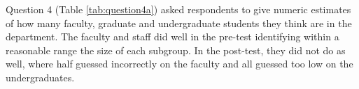 Question 4 (Table \ref{tab:question4a}) asked respondents to give numeric
estimates of how many faculty, graduate and undergraduate students they think
are in the department.  The faculty and staff did well in the pre-test
identifying within a reasonable range the size of each subgroup.  In the
post-test, they did not do as well, where half guessed incorrectly on the
faculty and all guessed too low on the undergraduates.


